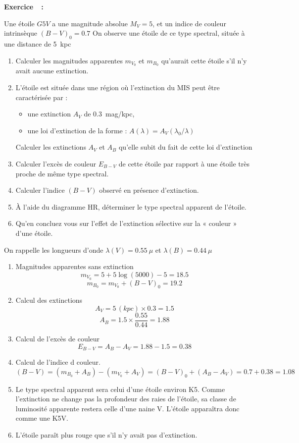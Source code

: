 \documentclass[a4paper,10pt]{report}
\newcounter{noexo}
\newenvironment{Exercise}[1][]{%
  \stepcounter{noexo}
  \medskip\noindent\textbf{Exercice~\thenoexo~:~#1}
  \medskip\par
  \addcontentsline{toc}{paragraph}{Exercice~\thenoexo~:~#1}
}{}
\begin{document}
\begin{Exercise}
  Une étoile $G5V$ a une magnitude absolue $M_V= 5$, et un indice de
  couleur intrinsèque $(B-V)_0 =0.7$ On observe une étoile de ce type
  spectral, située à une distance de 5~kpc
  \begin{enumerate}
  \item Calculer les magnitudes apparentes $m_{V_0}$ et $m_{B_0}$
    qu'aurait cette étoile s'il n'y avait aucune extinction.
  \item L'étoile est située dans une région où l'extinction du MIS
    peut être caractérisée par :
    \begin{itemize}
    \item une extinction $A_V$ de 0.3~mag/kpc,
    \item une loi d'extinction de la forme : $A(\lambda) = A_V
      (\lambda_0/\lambda)$
    \end{itemize}
    Calculer les extinctions $A_V$ et $A_B$ qu'elle subit du fait de
    cette loi d'extinction
  \item Calculer l'excès de couleur $E_{B-V}$ de cette étoile par
    rapport à une étoile très proche de même type spectral.
  \item Calculer l'indice $(B-V)$ observé en présence d'extinction.
  \item À l'aide du diagramme HR, déterminer le type spectral apparent
    de l'étoile.
  \item Qu'en concluez vous sur l'effet de l'extinction sélective sur
    la « couleur » d'une étoile.
  \end{enumerate}

  On rappelle les longueurs d'onde $\lambda(V)=0.55~\mu$ et
  $\lambda(B)=0.44~\mu$
\end{Exercise}

\begin{Answer}
  \begin{enumerate}
  \item Magnitudes apparentes sans extinction
    $$
    m_{V_0} = 5 + 5\log(5000) -5 = 18.5
    $$
    $$
    m_{B_0} = m_{V_0} + (B-V)_0 = 19.2
    $$
  \item Calcul des extinctions
    $$
    A_V = 5\,(kpc)\times 0.3=1.5
    $$
    $$
    A_B = 1.5 \times \frac{0.55}{0.44} = 1.88
    $$
  \item Calcul de l'excès de couleur
    $$
    E_{B-V} = A_B-A_V = 1.88 - 1.5 = 0.38
    $$
  \item Calcul de l'indice d couleur.
    $$
    (B-V) = (m_{B_0} +A_B) - (m_{V_0} +A_V) = (B-V)_0 + (A_B- A_V) =
    0.7 + 0.38 = 1.08
    $$
  \item Le type spectral apparent sera celui d'une étoile environ
    K5. Comme l'extinction ne change pas la profondeur des raies de
    l'étoile, sa classe de luminosité apparente restera celle d'une
    naine V. L'étoile apparaîtra donc comme une K5V.
  \item L'étoile paraît plus rouge que s'il n'y avait pas d'extinction.
  \end{enumerate}
\end{Answer}
\end{document}
